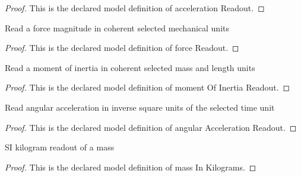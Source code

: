 \begin{proof}
  This is the declared model definition of acceleration Readout.
\end{proof}
\begin{definition}
  \label{def:physics:phyx-mini-0706:phyxminiproblems-problemphyxmini0706-forcereadout}
  Read a force magnitude in coherent selected mechanical units
\end{definition}
\begin{proof}
  This is the declared model definition of force Readout.
\end{proof}
\begin{definition}
  \label{def:physics:phyx-mini-0706:phyxminiproblems-problemphyxmini0706-momentofinertiareadout}
  Read a moment of inertia in coherent selected mass and length units
\end{definition}
\begin{proof}
  This is the declared model definition of moment Of Inertia Readout.
\end{proof}
\begin{definition}
  \label{def:physics:phyx-mini-0706:phyxminiproblems-problemphyxmini0706-angularaccelerationreadout}
  Read angular acceleration in inverse square units of the selected time unit
\end{definition}
\begin{proof}
  This is the declared model definition of angular Acceleration Readout.
\end{proof}
\begin{definition}
  \label{def:physics:phyx-mini-0706:phyxminiproblems-problemphyxmini0706-massinkilograms}
  SI kilogram readout of a mass
\end{definition}
\begin{proof}
  This is the declared model definition of mass In Kilograms.
\end{proof}
